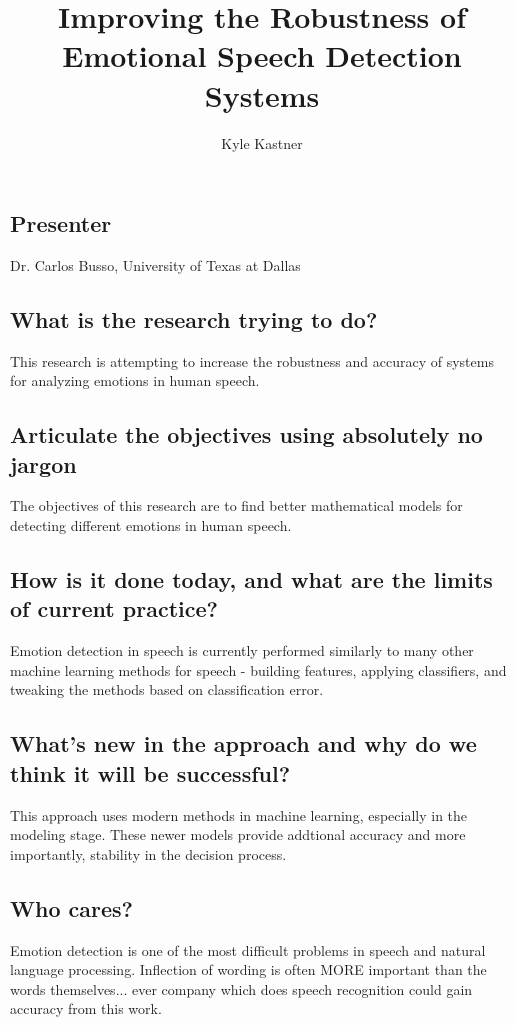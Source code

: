 \documentclass[9pt]{article}
\begin{document}
\title{Improving the Robustness of Emotional Speech Detection Systems}
\author{Kyle Kastner}

\maketitle

\subsection*{Presenter}
Dr. Carlos Busso, University of Texas at Dallas 
\subsection*{What is the research trying to do?}
This research is attempting to increase the robustness and accuracy of systems for analyzing emotions in human speech.
\subsection*{Articulate the objectives using absolutely no jargon}
The objectives of this research are to find better mathematical models for detecting different emotions in human speech.
\subsection*{How is it done today, and what are the limits of current practice?}
Emotion detection in speech is currently performed similarly to many other machine learning methods for speech - building features,
applying classifiers, and tweaking the methods based on classification error.
\subsection*{What's new in the approach and why do we think it will be successful?}
This approach uses modern methods in machine learning, especially in the modeling stage. These newer models
provide addtional accuracy and more importantly, stability in the decision process.
\subsection*{Who cares?}
Emotion detection is one of the most difficult problems in speech and natural language processing. Inflection
of wording is often MORE important than the words themselves... ever company which does speech recognition could
gain accuracy from this work.
\end{document}
